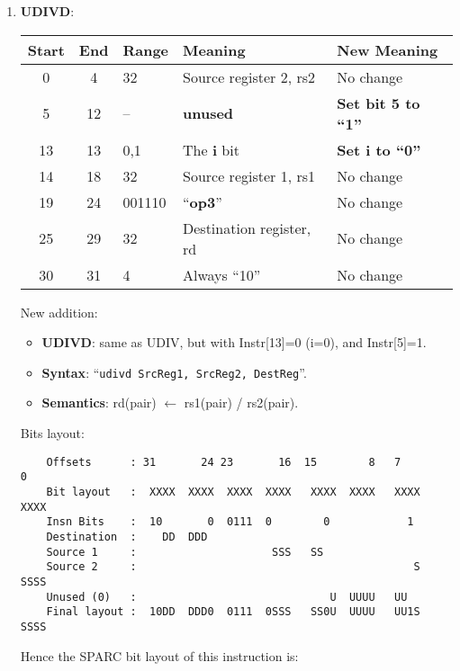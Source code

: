 \begin{enumerate}
\item \textbf{UDIVD}:\\
  \begin{center}
    \begin{tabular}[p]{|c|c|l|l|l|}
      \hline
      \textbf{Start} & \textbf{End} & \textbf{Range} & \textbf{Meaning} &
                                                                          \textbf{New Meaning}\\
      \hline
      0 & 4 & 32 & Source register 2, rs2 & No change \\
      5 & 12 & -- & \textbf{unused} & \textbf{Set bit 5 to ``1''} \\
      13 & 13 & 0,1 & The \textbf{i} bit & \textbf{Set i to ``0''} \\
      14 & 18 & 32 & Source register 1, rs1 & No change \\
      19 & 24 & 001110 & ``\textbf{op3}'' & No change \\
      25 & 29 & 32 & Destination register, rd & No change \\
      30 & 31 & 4 & Always ``10'' & No change \\
      \hline
    \end{tabular}
  \end{center}
  New addition:
  \begin{itemize}
  \item []\textbf{UDIVD}: same as UDIV, but with Instr[13]=0 (i=0), and
    Instr[5]=1.
  \item []\textbf{Syntax}: ``\texttt{udivd  SrcReg1, SrcReg2, DestReg}''.
  \item []\textbf{Semantics}: rd(pair) $\leftarrow$ rs1(pair) / rs2(pair).
  \end{itemize}
  Bits layout:
\begin{verbatim}
    Offsets      : 31       24 23       16  15        8   7        0
    Bit layout   :  XXXX  XXXX  XXXX  XXXX   XXXX  XXXX   XXXX  XXXX
    Insn Bits    :  10       0  0111  0        0            1       
    Destination  :    DD  DDD                                       
    Source 1     :                     SSS   SS
    Source 2     :                                           S  SSSS
    Unused (0)   :                              U  UUUU   UU        
    Final layout :  10DD  DDD0  0111  0SSS   SS0U  UUUU   UU1S  SSSS
\end{verbatim}

  Hence the SPARC bit layout of this instruction is:


\end{enumerate}
